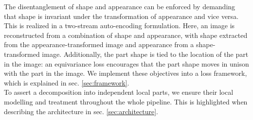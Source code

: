 	The disentanglement of shape and appearance can be enforced by demanding that shape is invariant under the transformation of appearance and vice versa. This is realized in a two-stream auto-encoding formulation. Here, an image is reconstructed from a combination of shape and appearance, with shape extracted from the appearance-transformed image and appearance from a shape-transformed image. Additionally, the part shape is tied to the location of the part in the image: an equivariance loss encourages that the part shape moves in unison with the part in the image. We implement these objectives into a loss framework, which is explained in sec. \ref{sec:framework}. \\
	To assert a decomposition into independent local parts, we ensure their local modelling and treatment throughout the whole pipeline. This is highlighted when describing the architecture in sec. \ref{sec:architecture}.

